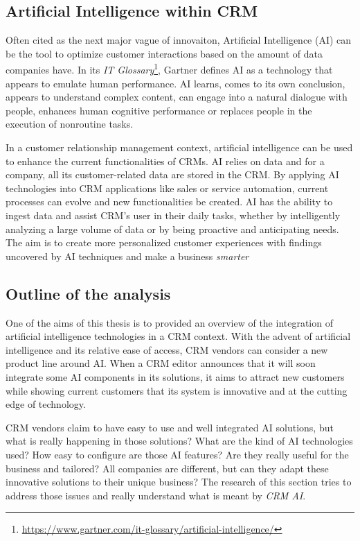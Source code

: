 \subsection{Artificial Intelligence within CRM}

Often cited as the next major vague of innovaiton, Artificial Intelligence (AI) can be the tool to optimize customer interactions based on the amount of data companies have. In its \textit{IT Glossary}\footnote{\url{https://www.gartner.com/it-glossary/artificial-intelligence/}}, Gartner defines AI as a technology that appears to emulate human performance. AI learns, comes to its own conclusion, appears to understand complex content, can engage into a natural dialogue with people, enhances human cognitive performance or replaces people in the execution of nonroutine tasks.

In a customer relationship management context, artificial intelligence can be used to enhance the current functionalities of CRMs. AI relies on data and for a company, all its customer-related data are stored in the CRM. By applying AI technologies into CRM applications like sales or service automation, current processes can evolve and new functionalities be created. AI has the ability to ingest data and assist CRM's user in their daily tasks, whether by intelligently analyzing a large volume of data or by being proactive and anticipating needs. The aim is to create more personalized customer experiences with findings uncovered by AI techniques and make a business \textit{smarter}


\subsection{Outline of the analysis}
One of the aims of this thesis is to provided an overview of the integration of artificial intelligence technologies in a CRM context. With the advent of artificial intelligence and its relative ease of access, CRM vendors can consider a new product line around AI. When a CRM editor announces that it will soon integrate some AI components in its solutions, it aims to attract new customers while showing current customers that its system is innovative and at the cutting edge of technology.

CRM vendors claim to have easy to use and well integrated AI solutions, but what is really happening in those solutions? What are the kind of AI technologies used? How easy to configure are those AI features? Are they really useful for the business and tailored? All companies are different, but can they adapt these innovative solutions to their unique business? The research of this section tries to address those issues and really understand what is meant by \textit{CRM AI}.


